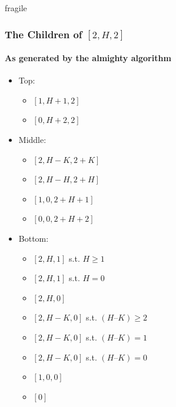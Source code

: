 \documentclass[aspectratio=169,usenames,dvipsnames]{beamer}
\begin{document}
\begin{frame}{fragile}
    \frametitle{The Children of $[2, H, 2]$}
    \framesubtitle{As generated by the almighty algorithm}
    
    \begin{multicols}{2}
    \begin{itemize}
        \item Top:
        \begin{itemize}
            \item $[1, H + 1, 2]$
            \item $[0, H + 2, 2]$
        \end{itemize}
    \end{itemize}
    
    \begin{itemize}
        \item Middle:
        \begin{itemize}
            \item $[2, H - K, 2 + K]$
            \item $[2, H - H, 2 + H]$
            \item $[1, 0, 2 + H + 1]$
            \item $[0, 0, 2 + H + 2]$
        \end{itemize}
    \end{itemize}
    
    \begin{itemize}
        \item Bottom:
        \begin{itemize}
            \item $[2, H, 1]$ s.t. $H \geq 1$
            \item $[2, H, 1]$ s.t. $H = 0$
            \item $[2, H, 0]$
            \item $[2, H - K, 0]$ s.t. $(H – K) \geq 2$
            \item $[2, H - K, 0]$ s.t. $(H – K) = 1$
            \item $[2, H - K, 0]$ s.t. $(H – K) = 0$
            \item $[1, 0, 0]$
            \item $[0]$

        \end{itemize}
    \end{itemize}
    \end{multicols}
    
\end{frame}
\end{document}
